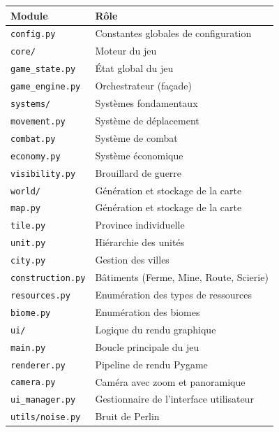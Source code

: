 \documentclass[12pt, a4paper]{article}
\begin{document}
\begin{center}
\begin{tabular}{ll}
\toprule
\textbf{Module} & \textbf{Rôle} \\
\midrule
\texttt{config.py} & Constantes globales de configuration \\
\texttt{core/} & Moteur du jeu \\
\texttt{\phantom{core}game\_state.py} & État global du jeu \\
\texttt{\phantom{core}game\_engine.py} & Orchestrateur (façade) \\
\texttt{\phantom{core}systems/} & Systèmes fondamentaux \\
\texttt{\phantom{coresystems}movement.py} & Système de déplacement \\
\texttt{\phantom{coresystems}combat.py} & Système de combat \\
\texttt{\phantom{coresystems}economy.py} & Système économique \\
\texttt{\phantom{coresystems}visibility.py} & Brouillard de guerre \\
\texttt{world/} & Génération et stockage de la carte \\
\texttt{\phantom{world}map.py} & Génération et stockage de la carte \\
\texttt{\phantom{world}tile.py} & Province individuelle \\
\texttt{\phantom{world}unit.py} & Hiérarchie des unités \\
\texttt{\phantom{world}city.py} & Gestion des villes \\
\texttt{\phantom{world}construction.py} & Bâtiments (Ferme, Mine, Route, Scierie) \\
\texttt{\phantom{world}resources.py} & Enumération des types de ressources \\
\texttt{\phantom{world}biome.py} & Enumération des biomes \\
\texttt{ui/} & Logique du rendu graphique \\
\texttt{\phantom{ui}main.py} & Boucle principale du jeu \\
\texttt{\phantom{ui}renderer.py} & Pipeline de rendu Pygame \\
\texttt{\phantom{ui}camera.py} & Caméra avec zoom et panoramique \\
\texttt{\phantom{ui}ui\_manager.py} & Gestionnaire de l'interface utilisateur \\
\texttt{utils/noise.py} & Bruit de Perlin \\
\bottomrule
\end{tabular}
\end{center}
\end{document}
